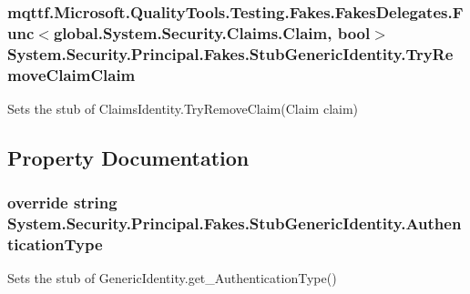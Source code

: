 \hypertarget{class_system_1_1_security_1_1_principal_1_1_fakes_1_1_stub_generic_identity_a2a12d65a713a3db0d8f81b8617aee32a}{
\subsubsection[{Try\-Remove\-Claim\-Claim}]{\setlength{\rightskip}{0pt plus 5cm}mqttf.\-Microsoft.\-Quality\-Tools.\-Testing.\-Fakes.\-Fakes\-Delegates.\-Func$<$global.\-System.\-Security.\-Claims.\-Claim, bool$>$ System.\-Security.\-Principal.\-Fakes.\-Stub\-Generic\-Identity.\-Try\-Remove\-Claim\-Claim}}\label{class_system_1_1_security_1_1_principal_1_1_fakes_1_1_stub_generic_identity_a2a12d65a713a3db0d8f81b8617aee32a}


Sets the stub of Claims\-Identity.\-Try\-Remove\-Claim(\-Claim claim)



\subsection{Property Documentation}
\hypertarget{class_system_1_1_security_1_1_principal_1_1_fakes_1_1_stub_generic_identity_a49cc2df850e9687c8c3057c3b3f801b0}{
\subsubsection[{Authentication\-Type}]{\setlength{\rightskip}{0pt plus 5cm}override string System.\-Security.\-Principal.\-Fakes.\-Stub\-Generic\-Identity.\-Authentication\-Type\hspace{0.3cm}{\ttfamily [get]}}}\label{class_system_1_1_security_1_1_principal_1_1_fakes_1_1_stub_generic_identity_a49cc2df850e9687c8c3057c3b3f801b0}


Sets the stub of Generic\-Identity.\-get\-\_\-\-Authentication\-Type()

